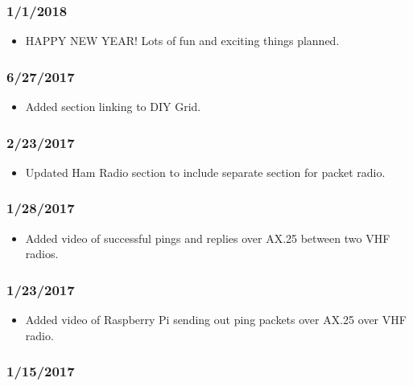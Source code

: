 \subsubsection{1/1/2018}

\begin{itemize}
\item HAPPY NEW YEAR! Lots of fun and exciting things planned.
\end{itemize}

\subsubsection{6/27/2017}

\begin{itemize}
\item Added section linking to DIY Grid.
\end{itemize}

\subsubsection{2/23/2017}

\begin{itemize}
\item Updated Ham Radio section to include separate section for packet radio.
\end{itemize}

\subsubsection{1/28/2017}

\begin{itemize}
\item Added video of successful pings and replies over AX.25 between two VHF radios.
\end{itemize}

\subsubsection{1/23/2017}

\begin{itemize}
\item Added video of Raspberry Pi sending out ping packets over AX.25 over VHF radio.
\end{itemize}

\subsubsection{1/15/2017}

